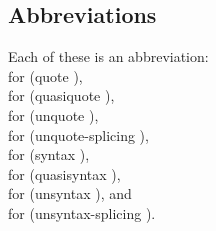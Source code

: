 \subsection{Abbreviations}\unsection
\label{quotesection}

\begin{entry}{%
}

Each of these is an abbreviation:
\\\quad{}\singlequote{}
for {\cf (quote )},
\\\quad{}\backquote{}
for {\cf (quasiquote )},
\\\quad\schindex{,}{\cf,}
for {\cf (unquote )},
\\\quad{}\atsign{}
for {\cf (unquote-splicing )},
\\\quad{}
for {\cf (syntax )},
\\\quad{}
for {\cf (quasisyntax )},
\\\quad\sharpindex{,}{\cf\#,}
for {\cf (unsyntax )}, and
\\\quad{}
for {\cf (unsyntax-splicing )}.
\end{entry}

